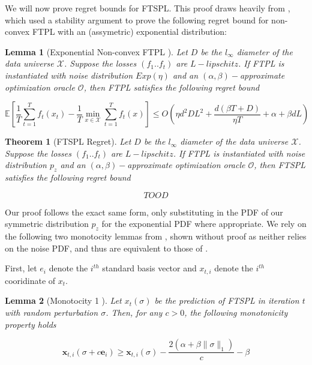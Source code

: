 \documentclass[]{article}
\newcommand{\X}{\mathcal{X}}
\newtheorem{lemma}{Lemma}[section]
\newtheorem{theorem}{Theorem}[section]
\theoremstyle{definition}
\begin{document}
We will now prove regret bounds for FTSPL. This proof draws heavily from \cite{SN19}, which used a stability argument to prove the following regret bound for non-convex FTPL with an (assymetric) exponential distribution:

\begin{lemma}[Exponential Non-convex FTPL \cite{SN19}]
    Let $D$ be the $l_\infty$ diameter of the data universe $\X$. Suppose the losses $(f_1..f_t)$ are $L-lipschitz$. If FTPL is instantiated with noise distribution $Exp(\eta)$ and an $(\alpha, \beta)-$approximate optimization oracle $\mathcal{O}$, then FTPL satisfies the following regret bound

    \begin{equation}
        \mathbb{E}\left[ \frac{1}{T}\sum_{t=1}^T f_t(x_t) - \frac{1}{T}\min_{x\in \X}\sum_{t=1}^T f_t(x) \right] \leq O(\eta d^2 D L^2 + \frac{d(\beta T + D)}{\eta T} + \alpha + \beta d L)
    \end{equation}
\end{lemma}


\begin{theorem}[FTSPL Regret]\label{thm:ftspl-regret}
    Let $D$ be the $l_\infty$ diameter of the data universe $\X$. Suppose the losses $(f_1..f_t)$ are $L-lipschitz$. If FTPL is instantiated with noise distribution $p_z$ and an $(\alpha, \beta)-$approximate optimization oracle $\mathcal{O}$, then FTSPL satisfies the following regret bound

    \begin{equation}
        TOOD
    \end{equation}
\end{theorem}
Our proof follows the exact same form, only substituting in the PDF of our symmetric distribution $p_z$ for the exponential PDF where appropriate. We rely on the following two monotocity lemmas from , shown without proof as neither relies on the noise PDF, and thus are equivalent to those of \cite{SN19}. 



First, let $e_i$ denote the $i^{th}$ standard basis vector and $x_{t,i}$ denote the $i^{th}$ cooridinate of $x_t$. 

\begin{lemma}[Monotocity 1 \cite{SN19}]
    Let $x_t(\sigma)$ be the prediction of FTSPL in iteration $t$ with random perturbation $\sigma$. Then, for any $c > 0$, the following monotonicity property holds

    \begin{equation}
        \mathbf{x}_{t, i}\left(\sigma+c \mathbf{e}_{i}\right) \geq \mathbf{x}_{t, i}(\sigma)-\frac{2\left(\alpha+\beta\|\sigma\|_{1}\right)}{c}-\beta
    \end{equation}
\end{lemma}
\end{document}
